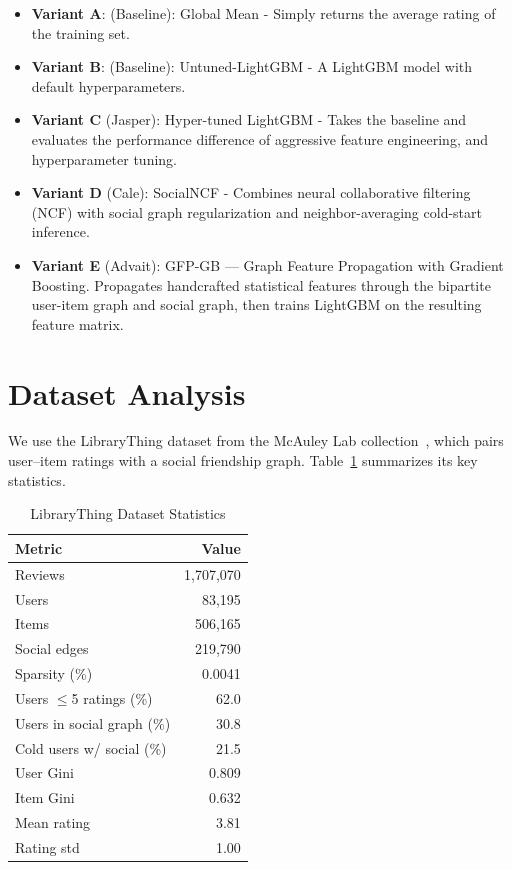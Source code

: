 \documentclass[conference]{IEEEtran}
\begin{document}
\begin{itemize}
  \item \textbf{Variant A}: (Baseline): Global Mean - Simply returns the average rating of the training set.
  \item \textbf{Variant B}: (Baseline): Untuned-LightGBM - A LightGBM model with default hyperparameters.
  \item \textbf{Variant C} (Jasper): Hyper-tuned LightGBM - Takes the baseline and evaluates the performance difference of aggressive feature engineering, and hyperparameter tuning.
  \item \textbf{Variant D} (Cale): SocialNCF - Combines neural collaborative filtering (NCF) with social graph regularization and neighbor-averaging cold-start inference.
  \item \textbf{Variant E} (Advait): GFP-GB --- Graph Feature Propagation with Gradient Boosting. Propagates handcrafted statistical features through the bipartite user-item graph and social graph, then trains LightGBM on the resulting feature matrix.
\end{itemize}

\section{Dataset Analysis}
\label{sec:data}

We use the LibraryThing dataset from the McAuley Lab collection~\cite{koren2009mf}, which pairs user--item ratings with a social friendship graph. Table~\ref{tab:datasets} summarizes its key statistics.

\begin{table}[htbp]
\caption{LibraryThing Dataset Statistics}
\label{tab:datasets}
\centering
\begin{tabular}{lr}
\toprule
\textbf{Metric} & \textbf{Value} \\
\midrule
Reviews          & 1,707,070 \\
Users            & 83,195    \\
Items            & 506,165   \\
Social edges     & 219,790   \\
Sparsity (\%)    & 0.0041    \\
Users $\leq$5 ratings (\%) & 62.0 \\
Users in social graph (\%) & 30.8 \\
Cold users w/ social (\%)  & 21.5 \\
User Gini        & 0.809     \\
Item Gini        & 0.632     \\
Mean rating      & 3.81      \\
Rating std       & 1.00      \\
\bottomrule
\end{tabular}
\end{table}
\end{document}
